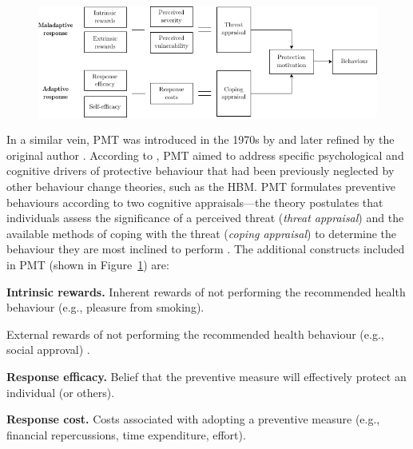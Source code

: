 \begin{figure}[htb!]
     \centering
     \begin{adjustbox}{center}
          \includegraphics[width=1.2\textwidth]{figures/ch5/pmt-conceptual-diagram.pdf}
     \end{adjustbox}
    \label{fig:lit-review-pmt}
\end{figure}

In a similar vein, PMT was introduced in the 1970s by \citet{rogers_protection_1975} and later refined by the original author \cite{rogers_cognitive_1983}. According to \citet{marikyan_protection_2023}, PMT aimed to address specific psychological and cognitive drivers of protective behaviour that had been previously neglected by other behaviour change theories, such as the HBM. PMT formulates preventive behaviours according to two cognitive appraisals---the theory postulates that individuals assess the significance of a perceived threat (\textit{threat appraisal}) and the available methods of coping with the threat (\textit{coping appraisal}) to determine the behaviour they are most inclined to perform \cite{norman_protection_2015}. The additional constructs included in PMT (shown in Figure~\ref{fig:lit-review-pmt}) are:

\begin{description}
    \item \textbf{Intrinsic rewards.} Inherent rewards of not performing the recommended health behaviour (e.g., pleasure from smoking).
    \item[Extrinsic rewards.] External rewards of not performing the recommended health behaviour (e.g., social approval) \cite{norman_protection_2015}.
    \item \textbf{Response efficacy.} Belief that the preventive measure will effectively protect an individual (or others).
    \item \textbf{Response cost.} Costs associated with adopting a preventive measure (e.g., financial repercussions, time expenditure, effort).
\end{description}

